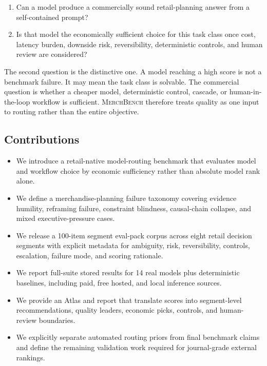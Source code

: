 \documentclass[11pt]{article}
\newcommand{\benchmark}{\textsc{MerchBench}}
\begin{document}
\begin{enumerate}[leftmargin=*]
  \item Can a model produce a commercially sound retail-planning answer from a self-contained prompt?
  \item Is that model the economically sufficient choice for this task class once cost, latency burden, downside risk, reversibility, deterministic controls, and human review are considered?
\end{enumerate}

The second question is the distinctive one. A model reaching a high score is not a benchmark failure. It may mean the task class is solvable. The commercial question is whether a cheaper model, deterministic control, cascade, or human-in-the-loop workflow is sufficient. \benchmark{} therefore treats quality as one input to routing rather than the entire objective.

\subsection*{Contributions}

\begin{itemize}[leftmargin=*]
  \item We introduce a retail-native model-routing benchmark that evaluates model and workflow choice by economic sufficiency rather than absolute model rank alone.
  \item We define a merchandise-planning failure taxonomy covering evidence humility, reframing failure, constraint blindness, causal-chain collapse, and mixed executive-pressure cases.
  \item We release a 100-item segment eval-pack corpus across eight retail decision segments with explicit metadata for ambiguity, risk, reversibility, controls, escalation, failure mode, and scoring rationale.
  \item We report full-suite stored results for 14 real models plus deterministic baselines, including paid, free hosted, and local inference sources.
  \item We provide an Atlas and report that translate scores into segment-level recommendations, quality leaders, economic picks, controls, and human-review boundaries.
  \item We explicitly separate automated routing priors from final benchmark claims and define the remaining validation work required for journal-grade external rankings.
\end{itemize}
\end{document}
